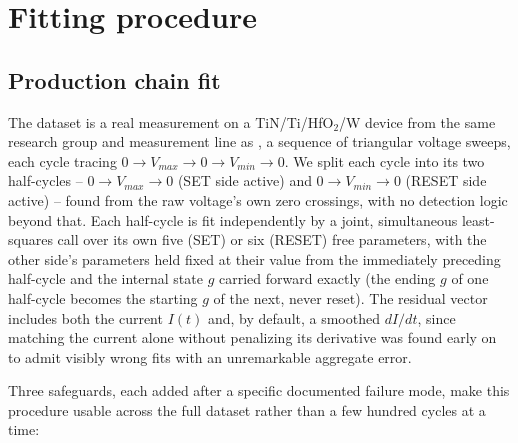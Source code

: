 \documentclass[11pt]{article}
\begin{document}
\section{Fitting procedure}
\label{sec:fitting}

\subsection{Production chain fit}

The dataset is a real measurement on a TiN/Ti/HfO$_2$/W device from the
same research group and measurement line as \cite{garcia2023temperature},
a sequence of triangular voltage sweeps, each cycle tracing
$0 \to V_{max} \to 0 \to V_{min} \to 0$. We split each cycle into its two
half-cycles -- $0 \to V_{max} \to 0$ (SET side active) and
$0 \to V_{min} \to 0$ (RESET side active) -- found from the raw voltage's
own zero crossings, with no detection logic beyond that. Each half-cycle is
fit independently by a joint, simultaneous least-squares call over its own
five (SET) or six (RESET) free parameters, with the other side's parameters
held fixed at their value from the immediately preceding half-cycle and the
internal state $g$ carried forward exactly (the ending $g$ of one half-cycle
becomes the starting $g$ of the next, never reset). The residual vector
includes both the current $I(t)$ and, by default, a smoothed $dI/dt$, since
matching the current alone without penalizing its derivative was found
early on to admit visibly wrong fits with an unremarkable aggregate error.

Three safeguards, each added after a specific documented failure mode,
make this procedure usable across the full dataset rather than a few
hundred cycles at a time:
\end{document}
